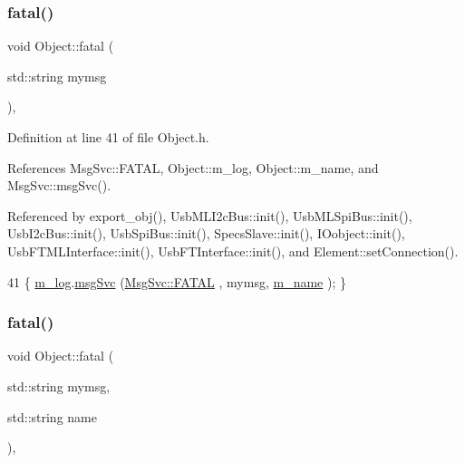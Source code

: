 \mbox{\label{classObject_aad5a16aac7516ce65bd5ec02ab07fc80}} 
\subsubsection{\texorpdfstring{fatal()}{fatal()}\hspace{0.1cm}{\footnotesize\ttfamily [1/2]}}
{\footnotesize\ttfamily void Object\+::fatal (\begin{DoxyParamCaption}\item[{std\+::string}]{mymsg }\end{DoxyParamCaption})\hspace{0.3cm}{\ttfamily [inline]}, {\ttfamily [inherited]}}



Definition at line 41 of file Object.\+h.



References Msg\+Svc\+::\+F\+A\+T\+AL, Object\+::m\+\_\+log, Object\+::m\+\_\+name, and Msg\+Svc\+::msg\+Svc().



Referenced by export\+\_\+obj(), Usb\+M\+L\+I2c\+Bus\+::init(), Usb\+M\+L\+Spi\+Bus\+::init(), Usb\+I2c\+Bus\+::init(), Usb\+Spi\+Bus\+::init(), Specs\+Slave\+::init(), I\+Oobject\+::init(), Usb\+F\+T\+M\+L\+Interface\+::init(), Usb\+F\+T\+Interface\+::init(), and Element\+::set\+Connection().


\begin{DoxyCode}
41 \{ \hyperlink{classObject_a0d269813dd7ac1f24bc143031e2963f2}{m\_log}.\hyperlink{classMsgSvc_ad25f18047920cc59a314e5098259711c}{msgSvc} (\hyperlink{classMsgSvc_ae671eb7301996cd049d2da8a65925926a59c73cb29edfc9cdf35845e2b1301363}{MsgSvc::FATAL}   , mymsg, \hyperlink{classObject_a8b83c95c705d2c3ba0d081fe1710f48d}{m\_name} ); \}
\end{DoxyCode}
\mbox{\label{classObject_ae62acd3d09f716220f75f252dc38bc9a}} 
\subsubsection{\texorpdfstring{fatal()}{fatal()}\hspace{0.1cm}{\footnotesize\ttfamily [2/2]}}
{\footnotesize\ttfamily void Object\+::fatal (\begin{DoxyParamCaption}\item[{std\+::string}]{mymsg,  }\item[{std\+::string}]{name }\end{DoxyParamCaption})\hspace{0.3cm}{\ttfamily [inline]}, {\ttfamily [inherited]}}



